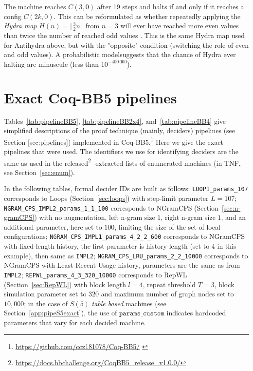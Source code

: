 \documentclass[a4paper,british]{article}
\theoremstyle{definition} %
\numberwithin{equation}{section}
\theoremstyle{definition} %
\newcommand{\CoqBB}{Coq-BB5\xspace}
\begin{document}
\begin{itemize}
          The machine reaches $C(3,0)$ after 19 steps and halts if and only if it reaches a config $C(2k,0)$. This can be reformulated as whether repeatedly applying the \textit{Hydra map} $H(n) = \lfloor \frac{3}{2}n\rfloor$ from $n=3$ will ever have reached more even values than twice the number of reached odd values \cite{ligocki2024bb25}. This is the same Hydra map used for Antihydra above, but with the "opposite" condition (switching the role of even and odd values). A probabilistic model suggests that the chance of Hydra ever halting are minuscule (less than $10^{-400\,000}$).

\end{itemize}

\newpage
\section{Exact \CoqBB pipelines}\label{app:pipelines}


Tables~\ref{tab:pipelineBB5}, \ref{tab:pipelineBB2x4}, and~\ref{tab:pipelineBB4} give simplified descriptions of the proof technique (mainly, deciders) pipelines (see Section \ref{sec:pipelines}) implemented in \CoqBB.\footnote{\url{https://github.com/ccz181078/Coq-BB5/} \cite{mxdys_2025_17061968}} Here we give the exact pipelines that were used. The identifiers we use for identifying deciders are the same as used in the released\footnote{\url{https://docs.bbchallenge.org/CoqBB5_release_v1.0.0/}} \Coq-extracted lists of enumerated machines (in TNF, see Section~\ref{sec:enum}).

In the following tables, formal decider IDs are built as follows: \texttt{LOOP1\_params\_107} corresponds to Loops (Section~\ref{sec:loops}) with step-limit parameter $L=107$; \texttt{NGRAM\_CPS\_IMPL2\_params\_1\_1\_100} corresponds to NGramCPS (Section~\ref{sec:n-gramCPS}) with no augmentation, left n-gram size $1$, right n-gram size $1$, and an additional parameter, here set to $100$, limiting the size of the set of local configurations; \texttt{NGRAM\_CPS\_IMPL1\_params\_4\_2\_2\_600} corresponds to NGramCPS with fixed-length history, the first parameter is history length (set to $4$ in this example), then same as \texttt{IMPL2}; \texttt{NGRAM\_CPS\_LRU\_params\_2\_2\_10000} corresponds to NGramCPS with Least Recent Usage history, parameters are the same as from \texttt{IMPL2}; \texttt{REPWL\_params\_4\_3\_320\_10000} corresponds to RepWL (Section~\ref{sec:RepWL}) with block length $l=4$, repeat threshold $T=3$, block simulation parameter set to $320$ and maximum number of graph nodes set to $10{,}000$; in the case of $S(5)$ \textit{table based} machines (see Section~\ref{app:pipeS5exact}), the use of $\texttt{params\_custom}$ indicates hardcoded parameters that vary for each decided machine.
\end{document}
